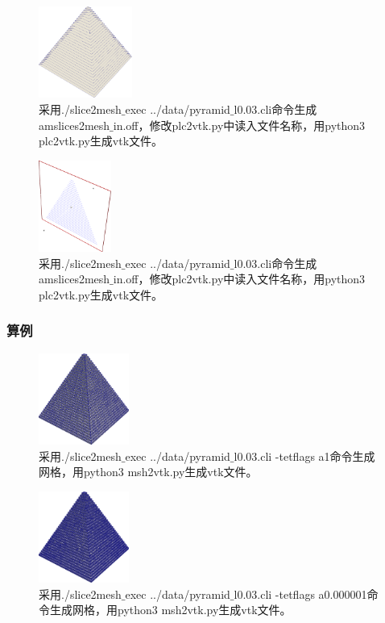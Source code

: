 \begin{figure}[!htbp]
  \centering
  \includegraphics[height=3cm]{fig/1/1.1.7.1:5.png}
  \caption{采用./slice2mesh$\_$exec ../data/pyramid$\_$l0.03.cli命令生成amslices2mesh$\_$in.off，修改plc2vtk.py中读入文件名称，用python3 plc2vtk.py生成vtk文件。}
  \label{fig:1-7}
\end{figure}

\begin{figure}[!htbp]
  \centering
  \includegraphics[height=3cm]{fig/1/1.1.7.1:6.png}
  \caption{采用./slice2mesh$\_$exec ../data/pyramid$\_$l0.03.cli命令生成amslices2mesh$\_$in.off，修改plc2vtk.py中读入文件名称，用python3 plc2vtk.py生成vtk文件。}
  \label{fig:1-7}
\end{figure}


\subsubsection{算例}

\begin{figure}[!htbp]
  \centering
  \includegraphics[height=3cm]{fig/1/20.png}
  \caption{采用./slice2mesh$\_$exec ../data/pyramid$\_$l0.03.cli -tetflags a1命令生成网格，用python3 msh2vtk.py生成vtk文件。}
  \label{fig:1-7}
\end{figure}

\begin{figure}[!htbp]
  \centering
  \includegraphics[height=3cm]{fig/1/21.png}
  \caption{采用./slice2mesh$\_$exec ../data/pyramid$\_$l0.03.cli -tetflags a0.000001命令生成网格，用python3 msh2vtk.py生成vtk文件。}
  \label{fig:1-7}
\end{figure}

